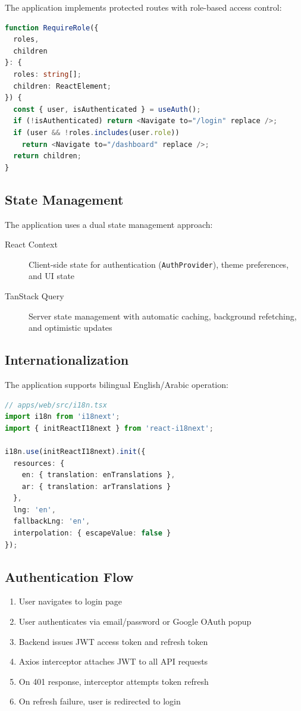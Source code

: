\documentclass[11pt,a4paper]{article}
\begin{document}
The application implements protected routes with role-based access control:

\begin{lstlisting}[language=TypeScript, caption=Protected Route Implementation]
function RequireRole({
  roles,
  children
}: {
  roles: string[];
  children: ReactElement;
}) {
  const { user, isAuthenticated } = useAuth();
  if (!isAuthenticated) return <Navigate to="/login" replace />;
  if (user && !roles.includes(user.role))
    return <Navigate to="/dashboard" replace />;
  return children;
}
\end{lstlisting}

\subsection{State Management}

The application uses a dual state management approach:

\begin{description}
  \item[React Context] Client-side state for authentication (\texttt{AuthProvider}), theme preferences, and UI state
  \item[TanStack Query] Server state management with automatic caching, background refetching, and optimistic updates
\end{description}

\subsection{Internationalization}

The application supports bilingual English/Arabic operation:

\begin{lstlisting}[language=TypeScript, caption=i18n Configuration]
// apps/web/src/i18n.tsx
import i18n from 'i18next';
import { initReactI18next } from 'react-i18next';

i18n.use(initReactI18next).init({
  resources: {
    en: { translation: enTranslations },
    ar: { translation: arTranslations }
  },
  lng: 'en',
  fallbackLng: 'en',
  interpolation: { escapeValue: false }
});
\end{lstlisting}

\subsection{Authentication Flow}

\begin{enumerate}
  \item User navigates to login page
  \item User authenticates via email/password or Google OAuth popup
  \item Backend issues JWT access token and refresh token
  \item Axios interceptor attaches JWT to all API requests
  \item On 401 response, interceptor attempts token refresh
  \item On refresh failure, user is redirected to login
\end{enumerate}
\end{document}
